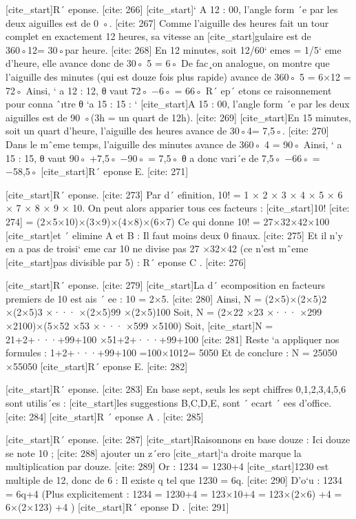 [cite_start]R´ eponse. [cite: 266]
[cite_start]` A 12 : 00, l’angle form ´e par les deux aiguilles est de 0 ◦. [cite: 267]
Comme
 l’aiguille des heures fait un tour complet en exactement 12 heures, sa vitesse an 
 [cite_start]gulaire est de 360◦12= 30◦par heure. [cite: 268]
En 12 minutes, soit 12/60` emes = 1/5` eme d’heure, elle avance donc de
 30◦
 5
 = 6◦
 De fac¸on analogue, on montre que l’aiguille des minutes (qui est douze fois plus
 rapide) avance de
 360◦
 5
 = 6×12 = 72◦
 Ainsi, ` a 12 : 12, θ vaut
 72◦ −6◦ = 66◦
 R´ ep´ etons ce raisonnement pour conna ˆıtre θ `a 15 : 15 : 
 ` 
 [cite_start]A 15 : 00, l’angle form ´e par les deux aiguilles est de 90 ◦(3h = un quart de 12h). [cite: 269]
[cite_start]En 15 minutes, soit un quart d’heure, l’aiguille des heures avance de 30◦4= 7,5◦. [cite: 270]
Dans le mˆeme temps, l’aiguille des minutes avance de 
 360◦
 4
 = 90◦
 Ainsi, ` a 15 : 15, θ vaut 90◦ +7,5◦ −90◦ = 7,5◦ θ a donc vari´e de 
 7,5◦ −66◦ = −58,5◦
 [cite_start]R´ eponse E. [cite: 271]

[cite_start]R´ eponse. [cite: 273]
Par d´ efinition, 10! = 1 × 2 × 3 × 4 × 5 × 6 × 7 × 8 × 9 × 10. On
 peut alors apparier tous ces facteurs :
 [cite_start]10! [cite: 274]
= (2×5×10)×(3×9)×(4×8)×(6×7)
 Ce qui donne
 10! = 27×32×42×100
 [cite_start]et ´ elimine A et B : Il faut moins deux 0 finaux. [cite: 275]
Et il n’y en a pas de troisi` eme car 10 ne divise pas 27 ×32×42 (ce n’est mˆeme 
 [cite_start]pas divisible par 5) : R´ eponse C . [cite: 276]

[cite_start]R´ eponse. [cite: 279]
[cite_start]La d´ ecomposition en facteurs premiers de 10 est ais ´ ee : 10 = 2×5. [cite: 280]
Ainsi,
 N = (2×5)×(2×5)2 ×(2×5)3 ×··· ×(2×5)99 ×(2×5)100
 Soit,
 N = (2×22 ×23 ×··· ×299 ×2100)×(5×52 ×53 ×··· ×599 ×5100)
 Soit,
 [cite_start]N = 21+2+···+99+100 ×51+2+···+99+100 [cite: 281]
Reste `a appliquer nos formules : 
 1+2+···+99+100 =100×1012= 5050
 Et de conclure :
 N = 25050 ×55050
 [cite_start]R´ eponse E. [cite: 282]

[cite_start]R´ eponse. [cite: 283]
En base sept, seuls les sept chiffres 0,1,2,3,4,5,6 sont utilis´es : 
 [cite_start]les suggestions B,C,D,E, sont ´ ecart ´ ees d’office. [cite: 284]
[cite_start]R ´ eponse A . [cite: 285]

[cite_start]R´ eponse. [cite: 287]
[cite_start]Raisonnons en base douze : Ici douze se note 10 ; [cite: 288]
ajouter un z´ero 
 [cite_start]`a droite marque la multiplication par douze. [cite: 289]
Or : 
 1234 = 1230+4
 [cite_start]1230 est multiple de 12, donc de 6 : Il existe q tel que 1230 = 6q. [cite: 290]
D’o`u : 
 1234 = 6q+4
 (Plus explicitement :
 1234 = 1230+4 = 123×10+4 = 123×(2×6) +4 = 6×(2×123) +4 )
 [cite_start]R´ eponse D . [cite: 291]

